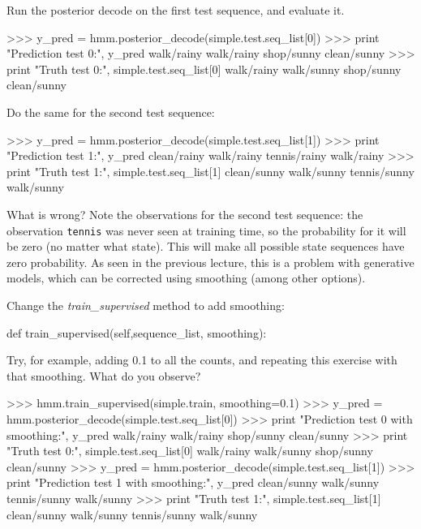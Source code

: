 \begin{exercise}
Run the posterior decode on the first test sequence, and evaluate it.
\begin{python}
>>> y_pred = hmm.posterior_decode(simple.test.seq_list[0])
>>> print "Prediction test 0:", y_pred
walk/rainy walk/rainy shop/sunny clean/sunny
>>> print "Truth test 0:", simple.test.seq_list[0]
walk/rainy walk/sunny shop/sunny clean/sunny 
\end{python}

Do the same for the second test sequence:
\begin{python}
>>> y_pred = hmm.posterior_decode(simple.test.seq_list[1])
>>> print "Prediction test 1:", y_pred
clean/rainy walk/rainy tennis/rainy walk/rainy 
>>> print "Truth test 1:", simple.test.seq_list[1]
clean/sunny walk/sunny tennis/sunny walk/sunny 
\end{python}

What is wrong? Note the observations for the second test sequence: the
observation {\tt tennis} was never seen at training time, so the probability for
it will be zero (no matter what state). This will make all possible state
sequences have zero probability.
As seen in the previous lecture, this is a problem with generative
models, which can be corrected using smoothing (among other
options).

Change the \emph{train\_supervised} method to add smoothing:
\begin{python}
def train_supervised(self,sequence_list, smoothing):
\end{python}

Try, for example, adding 0.1 to all the counts, and repeating this exercise with that smoothing. What do you observe?
\begin{python}
>>> hmm.train_supervised(simple.train, smoothing=0.1)
>>> y_pred = hmm.posterior_decode(simple.test.seq_list[0])
>>> print "Prediction test 0 with smoothing:", y_pred
walk/rainy walk/rainy shop/sunny clean/sunny 
>>> print "Truth test 0:", simple.test.seq_list[0]
walk/rainy walk/sunny shop/sunny clean/sunny
>>> y_pred = hmm.posterior_decode(simple.test.seq_list[1])
>>> print "Prediction test 1 with smoothing:", y_pred
clean/sunny walk/sunny tennis/sunny walk/sunny 
>>> print "Truth test 1:", simple.test.seq_list[1]
clean/sunny walk/sunny tennis/sunny walk/sunny 
\end{python}
\end{exercise}


